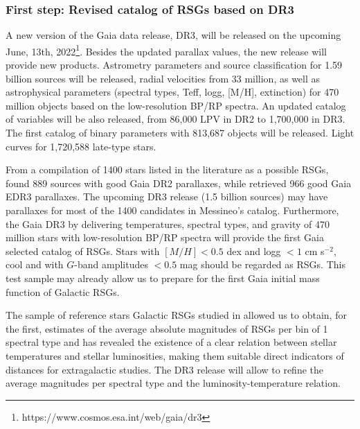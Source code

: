 \documentclass[final,11pt,onecolumn,a4paper,twoside]{scrbook_gj}
\begin{document}
\subsubsection{First step: Revised catalog of RSGs based on DR3}\label{law}

A new version of the Gaia data release, DR3, will be released 
on the upcoming June, 
13th, 2022\footnote{https://www.cosmos.esa.int/web/gaia/dr3}.
Besides the updated parallax values, the new release
will provide new products. Astrometry parameters and 
source classification for 1.59 billion sources will be 
released, radial velocities from 33 million, as well as 
astrophysical parameters 
(spectral types, Teff, logg, [M/H], extinction) 
for 470 million objects based on the low-resolution BP/RP spectra. 
An updated catalog of variables will be also released, 
from 86,000 LPV in DR2 to 1,700,000 in DR3.
The first catalog of binary parameters with 813,687
objects will be released.
Light curves for 1,720,588 late-type stars.

From a compilation of 1400 stars listed in the literature 
as a possible RSGs, \citet{messineo19}  found
889 sources with good Gaia DR2 parallaxes, 
while \citet{messineo21z}
retrieved 966  good Gaia EDR3 parallaxes. 
The upcoming DR3 release (1.5 billion sources) may have 
parallaxes for most of the 1400 candidates in Messineo's catalog.
Furthermore, the Gaia DR3 by delivering temperatures,  
spectral types, and gravity of 470 million stars with
low-resolution BP/RP spectra will provide
the first Gaia selected catalog of RSGs.
Stars with $[M/H] <0.5$ dex and 
logg $< 1$ cm s$^{-2}$, cool and with $G$-band amplitudes
$< 0.5$ mag should be regarded
as RSGs. This test sample may already allow us  
to prepare for the first Gaia initial mass 
function of Galactic RSGs. 

The sample of reference stars Galactic RSGs  studied in
\citet{messineo19} allowed us to obtain, for the first,   
estimates of the average absolute magnitudes of RSGs 
per bin of 1 spectral type and has revealed the
existence of a clear relation between stellar temperatures
and stellar luminosities, making them suitable direct
indicators of distances for extragalactic studies.
The DR3 release will  allow to refine
the average magnitudes per spectral type 
and the luminosity-temperature relation. 
\end{document}
